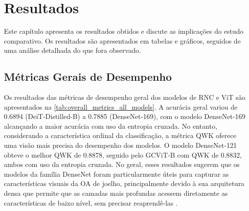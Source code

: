 \chapter{Resultados} \label{cap:resultados}

Este capítulo apresenta os resultados obtidos e discute as implicações do estudo comparativo. Os resultados são apresentados em tabelas e gráficos, seguidos de uma análise detalhada do que fora observado.

\section{Métricas Gerais de Desempenho}

Os resultados das métricas de desempenho geral dos modelos de RNC e ViT são apresentados na \autoref{tab:overall_metrics_all_models}. A acurácia geral variou de 0.6894 (DeiT-Distilled-B) a 0.7885 (DenseNet-169), com o modelo DenseNet-169 alcançando a maior acurácia com uso da entropia cruzada. No entanto, considerando a característica ordinal da classificação, a métrica QWK oferece uma visão mais precisa do desempenho dos modelos. O modelo DenseNet-121 obteve o melhor QWK de 0.8878, seguido pelo GCViT-B com QWK de 0.8832, ambos com uso da entropia cruzada. No geral, esses resultados sugerem que os modelos da família DenseNet foram particularmente úteis para capturar as características visuais da OA de joelho, principalmente devido à sua arquitetura densa que permite que as camadas mais profundas acessem diretamente as características de baixo nível, sem precisar reaprendê-las \citep{Huang2017}.

